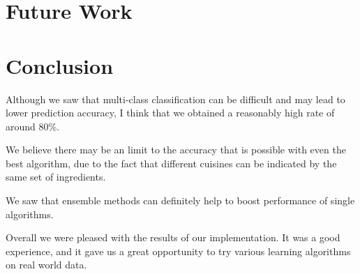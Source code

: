 \documentclass[11pt]{article}
\begin{document}






\section{Future Work}


\section{Conclusion}
Although we saw that multi-class classification can be difficult and
may lead to lower prediction accuracy, I think that we obtained a
reasonably high rate of around 80\%.  

We believe there may be an limit to the accuracy that is possible with
even the best algorithm, due to the fact that different cuisines can
be indicated by the same set of ingredients.

We saw that ensemble methods can definitely help to boost performance
of single algorithms.

Overall we were pleased with the results of our implementation.  It
was a good experience, and it gave us a great opportunity to try
various learning algorithms on real world data.



\end{document}
